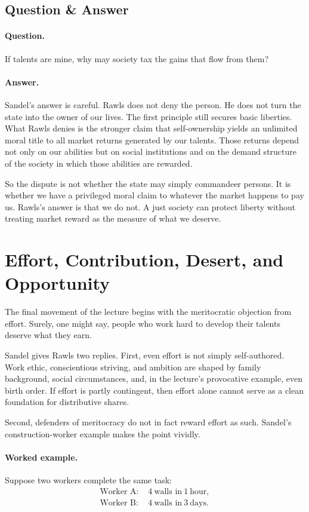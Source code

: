 \subsection{Question \& Answer}

\paragraph{Question.} If talents are mine, why may society tax the gains that flow from them?

\paragraph{Answer.} Sandel's answer is careful. Rawls does not deny the person. He does not turn the state into the owner of our lives. The first principle still secures basic liberties. What Rawls denies is the stronger claim that self-ownership yields an unlimited moral title to all market returns generated by our talents. Those returns depend not only on our abilities but on social institutions and on the demand structure of the society in which those abilities are rewarded.

So the dispute is not whether the state may simply commandeer persons. It is whether we have a privileged moral claim to whatever the market happens to pay us. Rawls's answer is that we do not. A just society can protect liberty without treating market reward as the measure of what we deserve.

\section{Effort, Contribution, Desert, and Opportunity}

The final movement of the lecture begins with the meritocratic objection from effort. Surely, one might say, people who work hard to develop their talents deserve what they earn.

Sandel gives Rawls two replies. First, even effort is not simply self-authored. Work ethic, conscientious striving, and ambition are shaped by family background, social circumstances, and, in the lecture's provocative example, even birth order. If effort is partly contingent, then effort alone cannot serve as a clean foundation for distributive shares.

Second, defenders of meritocracy do not in fact reward effort as such. Sandel's construction-worker example makes the point vividly.

\paragraph{Worked example.} Suppose two workers complete the same task:
\begin{align}
\text{Worker A: }& 4\ \text{walls in}\ 1\ \text{hour},\\
\text{Worker B: }& 4\ \text{walls in}\ 3\ \text{days}.
\end{align}

